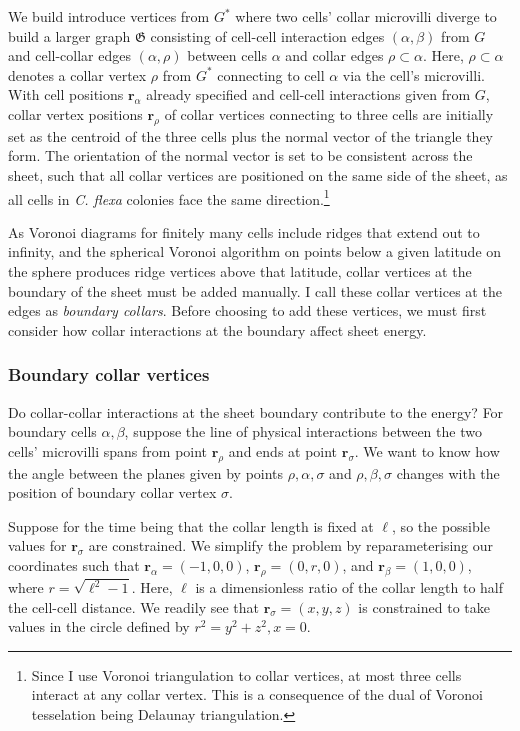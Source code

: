 We build introduce vertices from $G^*$ where two cells' collar microvilli diverge to build a larger graph $\mathfrak{G}$ consisting of cell-cell interaction edges $(\alpha, \beta)$ from $G$ and cell-collar edges $(\alpha, \rho)$ between cells $\alpha$ and collar edges $\rho \subset \alpha$. 
Here, $\rho \subset \alpha$ denotes a collar vertex $\rho$ from $G^*$ connecting to cell $\alpha$ via the cell's microvilli. 
With cell positions $\bm{r}_\alpha$ already specified and cell-cell interactions given from $G$, collar vertex positions $\bm{r}_\rho$ of collar vertices connecting to three cells are initially set as the centroid of the three cells plus the normal vector of the triangle they form. 
The orientation of the normal vector is set to be consistent across the sheet, such that all collar vertices are positioned on the same side of the sheet, as all cells in \textit{C. flexa} colonies face the same direction.\footnote{Since I use Voronoi triangulation to collar vertices, at most three cells interact at any collar vertex. This is a consequence of the dual of Voronoi tesselation being Delaunay triangulation.}

As Voronoi diagrams for finitely many cells include ridges that extend out to infinity, and the spherical Voronoi algorithm on points below a given latitude on the sphere produces ridge vertices above that latitude, collar vertices at the boundary of the sheet must be added manually. 
I call these collar vertices at the edges as \textit{boundary collars}. Before choosing to add these vertices, we must first consider how collar interactions at the boundary affect sheet energy.

\subsubsection{Boundary collar vertices} \label{subsubsec:bdary_verts}

Do collar-collar interactions at the sheet boundary contribute to the energy?
For boundary cells $\alpha, \beta$, suppose the line of physical interactions between the two cells' microvilli spans from point $\bm{r}_\rho$  and ends at point $\bm{r}_\sigma$. 
We want to know how the angle between the planes given by points $\rho, \alpha, \sigma$ and $\rho, \beta, \sigma$ changes with the position of boundary collar vertex $\sigma$. 

Suppose for the time being that the collar length is fixed at $\ell$, so the possible values for $\bm{r}_\sigma$ are constrained. 
We simplify the problem by reparameterising our coordinates such that $\bm{r}_\alpha = (-1, 0, 0)$, $\bm{r}_\rho = (0, r, 0)$, and $\bm{r}_\beta = (1, 0, 0)$, where $r = \sqrt{\ell^2 - 1}$. 
Here, $\ell$ is a dimensionless ratio of the collar length to half the cell-cell distance. 
We readily see that $\bm{r}_\sigma = (x, y, z)$ is constrained to take values in the circle defined by $r^2 = y^2 + z^2, x=0$. 

